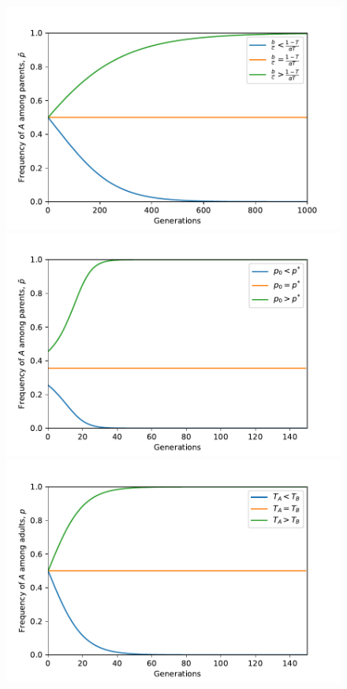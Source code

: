 \documentclass[12pt]{extarticle}
\begin{document}
{%
\begin{figure}[htb]
  \centering
    \includegraphics[scale=0.7]{Time_Figure_Equal_Horizontal.pdf}
    \includegraphics[scale=0.7]{Time_Figure_Only_Vertical_No_Alpha.pdf}
    \includegraphics[scale=0.7]{Time_Figure_No_Vertical.pdf}

\end{figure}}
\end{document}
